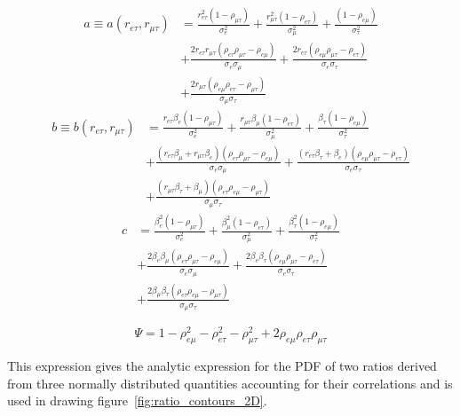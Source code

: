 \begin{align} 
    a \equiv a\left(r_{e\tau}, r_{\mu\tau}\right) 
            &= \frac{r_{e\tau}^{2}\left(1 - \rho_{\mu\tau} \right)}{\sigma_{e}^{2}}
            + \frac{r_{\mu\tau}^{2}\left(1 - \rho_{e\tau} \right)}{\sigma_{\mu}^{2}}
            + \frac{\left(1 - \rho_{e\mu} \right)}{\sigma_{\tau}^{2}} \\
            \nonumber
            &+ \frac{2r_{e\tau}r_{\mu\tau}\left( \rho_{e\tau} \rho_{\mu\tau}   - \rho_{e\mu} \right)}{\sigma_{e}\sigma_{\mu}} 
            \nonumber
            + \frac{2r_{e\tau}\left( \rho_{e\mu} \rho_{\mu\tau}   - \rho_{e\tau} \right)}{\sigma_{e}\sigma_{\tau}} \\
            \nonumber
            &+ \frac{2r_{\mu\tau}\left( \rho_{e\mu} \rho_{e\tau}   - \rho_{\mu\tau} \right)}{\sigma_{\mu}\sigma_{\tau}}
\end{align}
\begin{align}
    b \equiv b(r_{e\tau}, r_{\mu\tau}) 
        &= \frac{r_{e\tau}\beta_{e}\left(1 - \rho_{\mu\tau} \right)}{\sigma_{e}^{2}}
        + \frac{r_{\mu\tau}\beta_{\mu}\left(1 - \rho_{e\tau} \right)}{\sigma_{\mu}^{2}}
        + \frac{\beta_{\tau}\left(1 - \rho_{e\mu} \right)}{\sigma_{\tau}^{2}} \\
        \nonumber
        &+ \frac{\left(r_{e\tau}\beta_{\mu} + r_{\mu\tau}\beta_{e}\right)\left( \rho_{e\tau} \rho_{\mu\tau} - \rho_{e\mu} \right)}{\sigma_{e}\sigma_{\mu}}
        \nonumber
        + \frac{\left(r_{e\tau}\beta_{\tau} + \beta_{e}\right)\left( \rho_{e\mu} \rho_{\mu\tau}   - \rho_{e\tau} \right)}{\sigma_{e}\sigma_{\tau}} \\ 
        \nonumber
        &+ \frac{\left(r_{\mu\tau}\beta_{\tau} + \beta_{\mu}\right)\left( \rho_{e\tau} \rho_{e\mu}   - \rho_{\mu\tau} \right)}{\sigma_{\mu}\sigma_{\tau}}
\end{align}
\begin{align}
    c &= \frac{\beta_{e}^{2}\left(1 - \rho_{\mu\tau} \right)}{\sigma_{e}^{2}}
    + \frac{\beta_{\mu}^{2}\left(1 - \rho_{e\tau} \right)}{\sigma_{\mu}^{2}}
    + \frac{\beta_{\tau}^{2}\left(1 - \rho_{e\mu} \right)}{\sigma_{\tau}^{2}} \\
        \nonumber
        &+ \frac{2\beta_{e}\beta_{\mu}\left( \rho_{e\tau} \rho_{\mu\tau} - \rho_{e\mu} \right)}{\sigma_{e}\sigma_{\mu}}
        \nonumber
        + \frac{2\beta_{e}\beta_{\tau}\left( \rho_{e\mu} \rho_{\mu\tau}   - \rho_{e\tau} \right)}{\sigma_{e}\sigma_{\tau}} \\ 
        \nonumber
        &+ \frac{2\beta_{\mu}\beta_{\tau}\left( \rho_{e\tau} \rho_{e\mu}   - \rho_{\mu\tau} \right)}{\sigma_{\mu}\sigma_{\tau}}
\end{align}

\begin{equation}
    \Psi = 1 - \rho_{e\mu}^{2} - \rho_{e\tau}^{2} - \rho_{\mu\tau}^{2} + 2\rho_{e\mu}\rho_{e\tau}\rho_{\mu\tau}
\end{equation}

\noindent This expression gives the analytic expression for the PDF of two ratios
derived from three normally distributed quantities accounting for their
correlations and is used in drawing figure~\ref{fig:ratio_contours_2D}.
\FloatBarrier